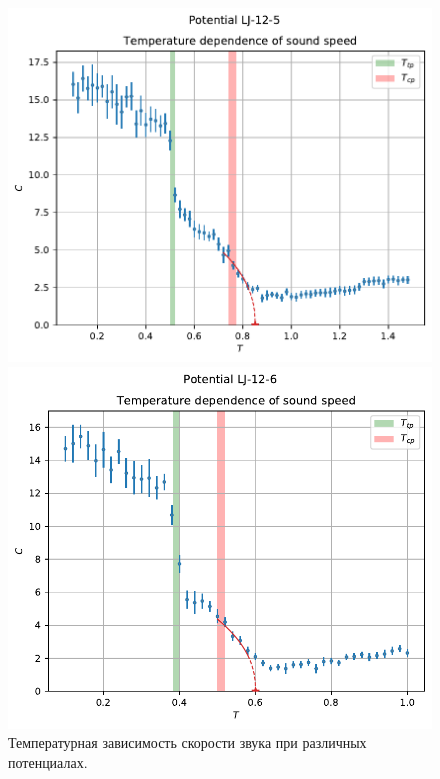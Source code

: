 \documentclass[pdf,hyperref={unicode}]{beamer}
\begin{document}
\begin{frame}
\begin{figure}[h]
\begin{center}
\begin{minipage}[h]{0.35\linewidth}
\includegraphics[width=\textwidth, keepaspectratio]{sound_speed_Potential LJ-12-5_1}
\end{minipage}
\begin{minipage}[h]{0.35\linewidth}
\includegraphics[width=\textwidth, keepaspectratio]{sound_speed_Potential LJ-12-6_1}
\end{minipage}
\caption{\tiny Температурная зависимость скорости звука при различных потенциалах.}
\label{risC}
\end{center}
\end{figure}

\end{frame}
\end{document}
